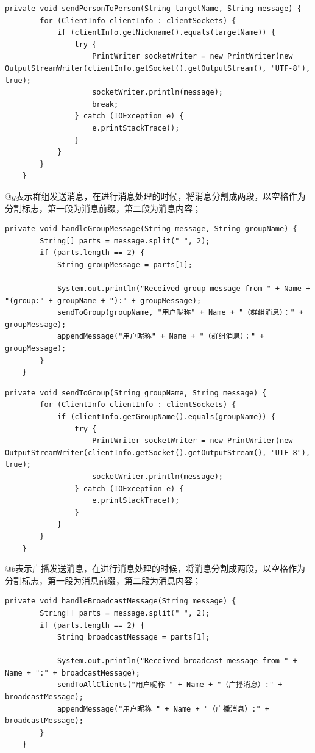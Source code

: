 \documentclass[UTF8,12pt]{article}
\begin{document}
\begin{lstlisting}[title=发送点对点消息,frame=shadowbox]
    private void sendPersonToPerson(String targetName, String message) {
        for (ClientInfo clientInfo : clientSockets) {
            if (clientInfo.getNickname().equals(targetName)) {
                try {
                    PrintWriter socketWriter = new PrintWriter(new OutputStreamWriter(clientInfo.getSocket().getOutputStream(), "UTF-8"), true);
                    socketWriter.println(message);
                    break;
                } catch (IOException e) {
                    e.printStackTrace();
                }
            }
        }
    }    
\end{lstlisting}

$@g$表示群组发送消息，在进行消息处理的时候，将消息分割成两段，以空格作为分割标志，第一段为消息前缀，第二段为消息内容；
\begin{lstlisting}[title=处理群组消息,frame=shadowbox]
    private void handleGroupMessage(String message, String groupName) {
        String[] parts = message.split(" ", 2);
        if (parts.length == 2) {
            String groupMessage = parts[1];

            System.out.println("Received group message from " + Name + "(group:" + groupName + "):" + groupMessage);
            sendToGroup(groupName, "用户昵称" + Name + "（群组消息）：" + groupMessage);
            appendMessage("用户昵称" + Name + "（群组消息）：" + groupMessage);
        }
    }
\end{lstlisting}

\begin{lstlisting}[title=发送群组消息,frame=shadowbox]
    private void sendToGroup(String groupName, String message) {
        for (ClientInfo clientInfo : clientSockets) {
            if (clientInfo.getGroupName().equals(groupName)) {
                try {
                    PrintWriter socketWriter = new PrintWriter(new OutputStreamWriter(clientInfo.getSocket().getOutputStream(), "UTF-8"), true);
                    socketWriter.println(message);
                } catch (IOException e) {
                    e.printStackTrace();
                }
            }
        }
    }
\end{lstlisting}

$@b$表示广播发送消息，在进行消息处理的时候，将消息分割成两段，以空格作为分割标志，第一段为消息前缀，第二段为消息内容；
\begin{lstlisting}[title=处理广播消息,frame=shadowbox]
    private void handleBroadcastMessage(String message) {
        String[] parts = message.split(" ", 2);
        if (parts.length == 2) {
            String broadcastMessage = parts[1];

            System.out.println("Received broadcast message from " + Name + ":" + broadcastMessage);
            sendToAllClients("用户昵称 " + Name + "（广播消息）:" + broadcastMessage);
            appendMessage("用户昵称 " + Name + "（广播消息）:" + broadcastMessage);
        }
    }
\end{lstlisting}
\end{document}
